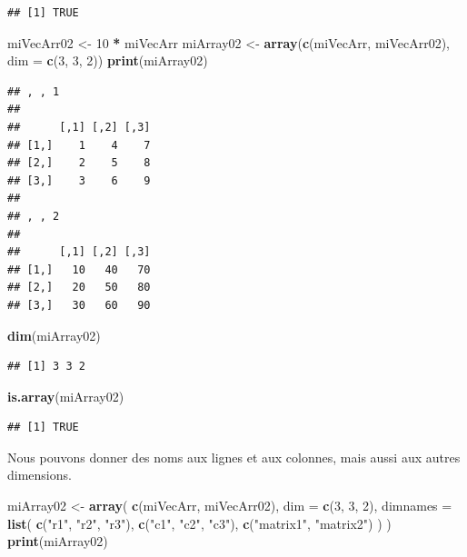 \documentclass[
]{book}
\newenvironment{Shaded}{\begin{snugshade}}{\end{snugshade}}
\newcommand{\DataTypeTok}[1]{\textcolor[rgb]{0.13,0.29,0.53}{#1}}
\newcommand{\DecValTok}[1]{\textcolor[rgb]{0.00,0.00,0.81}{#1}}
\newcommand{\KeywordTok}[1]{\textcolor[rgb]{0.13,0.29,0.53}{\textbf{#1}}}
\newcommand{\NormalTok}[1]{#1}
\newcommand{\OperatorTok}[1]{\textcolor[rgb]{0.81,0.36,0.00}{\textbf{#1}}}
\newcommand{\StringTok}[1]{\textcolor[rgb]{0.31,0.60,0.02}{#1}}
\begin{document}
\begin{verbatim}
## [1] TRUE
\end{verbatim}

\begin{Shaded}
\begin{Highlighting}[]
\NormalTok{miVecArr02 <-}\StringTok{ }\DecValTok{10} \OperatorTok{*}\StringTok{ }\NormalTok{miVecArr}
\NormalTok{miArray02 <-}\StringTok{ }\KeywordTok{array}\NormalTok{(}\KeywordTok{c}\NormalTok{(miVecArr, miVecArr02), }\DataTypeTok{dim =} \KeywordTok{c}\NormalTok{(}\DecValTok{3}\NormalTok{, }\DecValTok{3}\NormalTok{, }\DecValTok{2}\NormalTok{))}
\KeywordTok{print}\NormalTok{(miArray02)}
\end{Highlighting}
\end{Shaded}

\begin{verbatim}
## , , 1
## 
##      [,1] [,2] [,3]
## [1,]    1    4    7
## [2,]    2    5    8
## [3,]    3    6    9
## 
## , , 2
## 
##      [,1] [,2] [,3]
## [1,]   10   40   70
## [2,]   20   50   80
## [3,]   30   60   90
\end{verbatim}

\begin{Shaded}
\begin{Highlighting}[]
\KeywordTok{dim}\NormalTok{(miArray02)}
\end{Highlighting}
\end{Shaded}

\begin{verbatim}
## [1] 3 3 2
\end{verbatim}

\begin{Shaded}
\begin{Highlighting}[]
\KeywordTok{is.array}\NormalTok{(miArray02)}
\end{Highlighting}
\end{Shaded}

\begin{verbatim}
## [1] TRUE
\end{verbatim}

Nous pouvons donner des noms aux lignes et aux colonnes, mais aussi aux autres dimensions.

\begin{Shaded}
\begin{Highlighting}[]
\NormalTok{miArray02 <-}\StringTok{ }\KeywordTok{array}\NormalTok{(}
  \KeywordTok{c}\NormalTok{(miVecArr, miVecArr02), }
  \DataTypeTok{dim =} \KeywordTok{c}\NormalTok{(}\DecValTok{3}\NormalTok{, }\DecValTok{3}\NormalTok{, }\DecValTok{2}\NormalTok{), }
  \DataTypeTok{dimnames =} \KeywordTok{list}\NormalTok{(}
    \KeywordTok{c}\NormalTok{(}\StringTok{"r1"}\NormalTok{, }\StringTok{"r2"}\NormalTok{, }\StringTok{"r3"}\NormalTok{), }
    \KeywordTok{c}\NormalTok{(}\StringTok{"c1"}\NormalTok{, }\StringTok{"c2"}\NormalTok{, }\StringTok{"c3"}\NormalTok{), }
    \KeywordTok{c}\NormalTok{(}\StringTok{"matrix1"}\NormalTok{, }\StringTok{"matrix2"}\NormalTok{)}
\NormalTok{  )}
\NormalTok{)}
\KeywordTok{print}\NormalTok{(miArray02)}
\end{Highlighting}
\end{Shaded}
\end{document}
